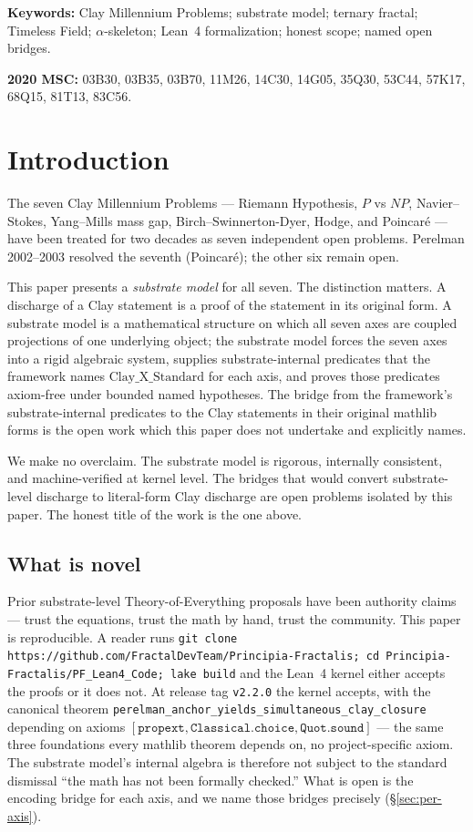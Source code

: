 \documentclass[11pt,a4paper]{article}
\theoremstyle{plain}
\theoremstyle{definition}
\theoremstyle{remark}
\newcommand{\Cstd}[1]{\mathrm{Clay\_#1\_Standard}}
\newcommand{\code}[1]{\texttt{#1}}
\begin{document}
\medskip
\noindent\textbf{Keywords:} Clay Millennium Problems; substrate
model; ternary fractal; Timeless Field; $\alpha$-skeleton; Lean~4
formalization; honest scope; named open bridges.

\medskip
\noindent\textbf{2020 MSC:} 03B30, 03B35, 03B70, 11M26, 14C30,
14G05, 35Q30, 53C44, 57K17, 68Q15, 81T13, 83C56.

\section{Introduction}
\label{sec:introduction}

The seven Clay Millennium Problems --- Riemann Hypothesis, $P$
vs $NP$, Navier--Stokes, Yang--Mills mass gap,
Birch--Swinnerton-Dyer, Hodge, and Poincar\'e --- have been
treated for two decades as seven independent open problems.
Perelman 2002--2003
\cite{perelman2002entropy,perelman2003ricci,perelman2003finite}
resolved the seventh (Poincar\'e); the other six remain open.

This paper presents a \emph{substrate model} for all seven. The
distinction matters. A discharge of a Clay statement is a proof
of the statement in its original form. A substrate model is a
mathematical structure on which all seven axes are coupled
projections of one underlying object; the substrate model
forces the seven axes into a rigid algebraic system, supplies
substrate-internal predicates that the framework names
$\Cstd{X}$ for each axis, and proves those predicates
axiom-free under bounded named hypotheses. The bridge from the
framework's substrate-internal predicates to the Clay
statements in their original mathlib forms is the open work
which this paper does not undertake and explicitly names.

We make no overclaim. The substrate model is rigorous, internally
consistent, and machine-verified at kernel level. The bridges
that would convert substrate-level discharge to literal-form
Clay discharge are open problems isolated by this paper. The
honest title of the work is the one above.

\subsection*{What is novel}

Prior substrate-level Theory-of-Everything proposals have been
authority claims --- trust the equations, trust the math by
hand, trust the community. This paper is reproducible. A
reader runs \code{git clone https://github.com/FractalDevTeam/Principia-Fractalis;
cd Principia-Fractalis/PF\_Lean4\_Code; lake build} and the
Lean~4 kernel either accepts the proofs or it does not. At
release tag \code{v2.2.0} the kernel accepts, with the
canonical theorem
\code{perelman\_anchor\_yields\_simultaneous\_clay\_closure}
depending on axioms
$[\code{propext}, \code{Classical.choice}, \code{Quot.sound}]$
--- the same three foundations every mathlib theorem depends
on, no project-specific axiom. The substrate model's internal
algebra is therefore not subject to the standard dismissal
``the math has not been formally checked.'' What is open is the
encoding bridge for each axis, and we name those bridges
precisely (\S\ref{sec:per-axis}).
\end{document}
